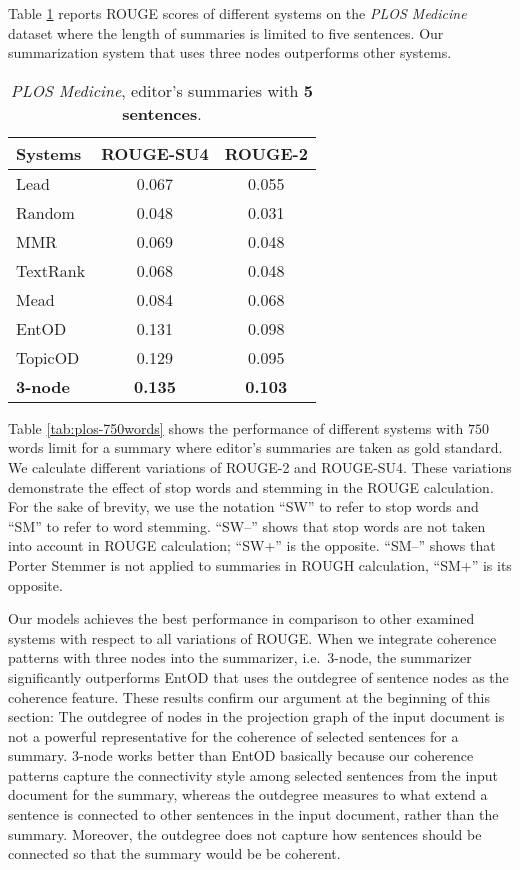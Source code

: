 Table \ref{table:plos_5len_editor} reports ROUGE scores of different systems on the \emph{PLOS Medicine} dataset where the length of summaries is limited to five sentences. 
Our summarization system that uses three nodes outperforms other systems.  


\begin{table}[!ht]
	\begin{center}
		\begin{tabular}{lcc}
		\toprule
		\textbf{Systems} 			& \textbf{ROUGE-SU4} &\textbf{ROUGE-2}\\
		\midrule
		Lead 				& 0.067 	& 0.055  \\
		Random 				& 0.048  	& 0.031  \\
		MMR 				& 0.069 	& 0.048  \\
		TextRank 			& 0.068  	& 0.048  \\
		Mead 				& 0.084 	& 0.068  \\
		EntOD 				& 0.131		& 0.098  \\
		TopicOD				& 0.129 	& 0.095  \\
		\textbf{3-node} 				& \textbf{0.135} & \textbf{0.103} \\
		\bottomrule
		\end{tabular}
	\end{center}
	\caption{\emph{PLOS Medicine}, editor's summaries with \textbf{5 sentences}.}
	\label{table:plos_5len_editor}
\end{table}

Table \ref{tab:plos-750words} shows the performance of different systems with $750$ words limit for a summary where editor's summaries are taken as gold standard. 
We calculate different variations of ROUGE-2 and ROUGE-SU4. 
These variations demonstrate the effect of stop words and stemming in the ROUGE calculation.
For the sake of brevity, we use the notation ``SW'' to refer to stop words and ``SM'' to refer to word stemming.  
``SW--'' shows that stop words are not taken into account in ROUGE calculation; ``SW+'' is the opposite. 
``SM--'' shows that Porter Stemmer is not applied to summaries in ROUGH calculation, ``SM+'' is its opposite. 
 
Our models achieves the best performance in comparison to other examined systems with respect to all variations of ROUGE. 
When we integrate coherence patterns with three nodes into the summarizer, i.e.\ 3-node, the summarizer significantly outperforms EntOD that uses the outdegree of sentence nodes as the coherence feature. 
These results confirm our argument at the beginning of this section: The outdegree of nodes in the projection graph of the input document is not a powerful representative for the coherence of selected sentences for a summary. 
3-node works better than EntOD basically because our coherence patterns capture the connectivity style among selected sentences from the input document for the summary, whereas
the outdegree measures to what extend a sentence is connected to other sentences in the input document, rather than the summary. 
Moreover, the outdegree does not capture how sentences should be connected so that the summary would be be coherent. 


